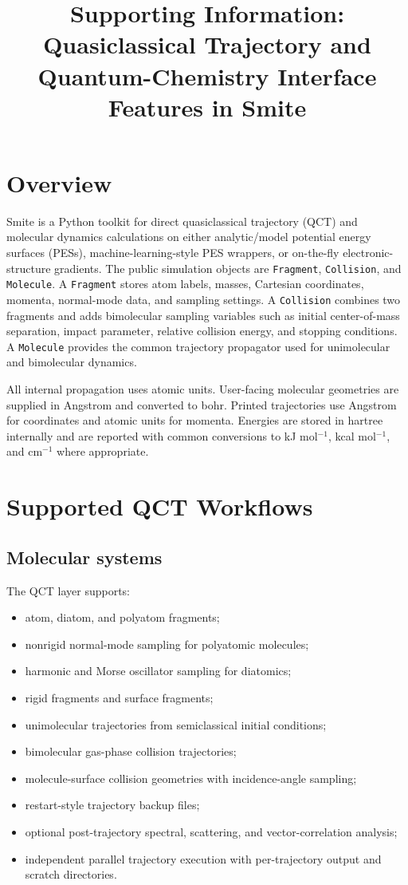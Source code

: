 \documentclass[11pt]{article}
\title{Supporting Information: Quasiclassical Trajectory and Quantum-Chemistry Interface Features in Smite}
\author{}
\date{}
\begin{document}
\maketitle

\section{Overview}

Smite is a Python toolkit for direct quasiclassical trajectory (QCT) and molecular dynamics calculations on either analytic/model potential energy surfaces (PESs), machine-learning-style PES wrappers, or on-the-fly electronic-structure gradients.  The public simulation objects are \texttt{Fragment}, \texttt{Collision}, and \texttt{Molecule}.  A \texttt{Fragment} stores atom labels, masses, Cartesian coordinates, momenta, normal-mode data, and sampling settings.  A \texttt{Collision} combines two fragments and adds bimolecular sampling variables such as initial center-of-mass separation, impact parameter, relative collision energy, and stopping conditions.  A \texttt{Molecule} provides the common trajectory propagator used for unimolecular and bimolecular dynamics.

All internal propagation uses atomic units.  User-facing molecular geometries are supplied in Angstrom and converted to bohr.  Printed trajectories use Angstrom for coordinates and atomic units for momenta.  Energies are stored in hartree internally and are reported with common conversions to kJ mol$^{-1}$, kcal mol$^{-1}$, and cm$^{-1}$ where appropriate.

\section{Supported QCT Workflows}

\subsection{Molecular systems}

The QCT layer supports:
\begin{itemize}
  \item atom, diatom, and polyatom fragments;
  \item nonrigid normal-mode sampling for polyatomic molecules;
  \item harmonic and Morse oscillator sampling for diatomics;
  \item rigid fragments and surface fragments;
  \item unimolecular trajectories from semiclassical initial conditions;
  \item bimolecular gas-phase collision trajectories;
  \item molecule-surface collision geometries with incidence-angle sampling;
  \item restart-style trajectory backup files;
  \item optional post-trajectory spectral, scattering, and vector-correlation analysis;
  \item independent parallel trajectory execution with per-trajectory output and scratch directories.
\end{itemize}
\end{document}
